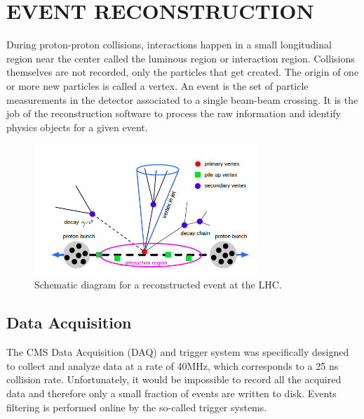 %
%
%
%



\chapter{EVENT RECONSTRUCTION \label{cha:eventreco}}
During proton-proton collisions, interactions happen in a small longitudinal region near the center called the luminous region or interaction region. Collisions themselves are not recorded, only the particles that get created. The origin of one or more new particles is called a vertex. An event is the set of particle measurements in the detector associated to a single beam-beam crossing. It is the job of the reconstruction software to process the raw information and identify physics objects for a given event.

 \begin{figure}[H]
 	\centering
 	\includegraphics[width=0.75\textwidth]{figures/eventvertex.png}
 	\singlespace
 	\caption{Schematic diagram for a reconstructed event at the LHC.}
 	\label{fig:vertex}
 \end{figure}


\section{Data Acquisition}
The CMS Data Acquisition (DAQ) and trigger system was specifically designed to collect and analyze data at a rate of 40MHz, which corresponds to a 25 ns collision rate. Unfortunately, it would be impossible to record all the acquired data and therefore only a small fraction of events are written to disk. Events filtering is performed online by the so-called trigger systems.

